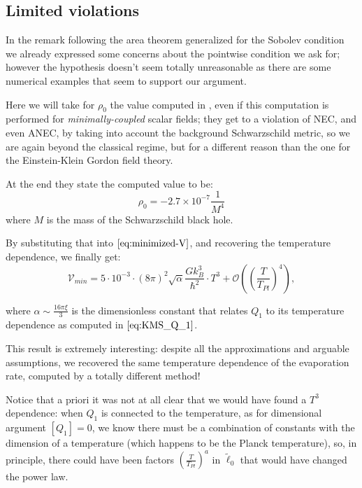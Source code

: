 \subsection{Limited violations}
In the remark following the area theorem generalized for the Sobolev condition we already expressed some concerns about the pointwise condition we ask for; however the hypothesis doesn't seem totally unreasonable as there are some numerical examples that seem to support our argument.

Here we will take for \(\rho_0\) the value computed in \cite{levi2016versatile}, even if this computation is performed for \emph{minimally-coupled} scalar fields; they get to a violation of NEC, and even ANEC, by taking into account the background Schwarzschild metric, so we are again beyond the classical regime, but for a different reason than the one for the Einstein-Klein Gordon field theory.

At the end they state the computed value to be:
\[
\rho_0 = - \si{2.7\times10^{-7}} \frac{1}{M^4}
\]
where \(M\) is the mass of the Schwarzschild black hole.

By substituting that into \(\eqref{eq:minimized-V}\), and recovering the temperature dependence, we finally get:
\begin{equation}
	\label{eq:KMS-minimized-V}
	\mathcal{V}_{min} = 5\cdot10^{-3} \cdot (8\pi)^2\sqrt{\alpha} \frac{Gk_B^3}{\hbar^2} \cdot T^3 + \mathcal{O}\left(\left(\frac{T}{T_{Pl}}\right)^4\right),
\end{equation}

where \(\alpha \sim \frac{16\pi\xi}{3}\) is the dimensionless constant that relates \(Q_1\) to its temperature dependence as computed in \(\eqref{eq:KMS_Q_1}\).

This result is extremely interesting: despite all the approximations and arguable assumptions, we recovered the same temperature dependence of the evaporation rate, computed by a totally different method! 

\begin{remark}
	Notice that a priori it was not at all clear that we would have found a \(T^3\) dependence: when \(Q_1\) is connected to the temperature, as for dimensional argument \(\left[Q_1\right] = 0\), we know there must be a combination of constants with the dimension of a temperature (which happens to be the Planck temperature), so, in principle, there could have been factors \(\left(\frac{T}{T_{Pl}}\right)^a\) in \(\tilde{\ell}_0\) that would have changed the power law.
\end{remark}

